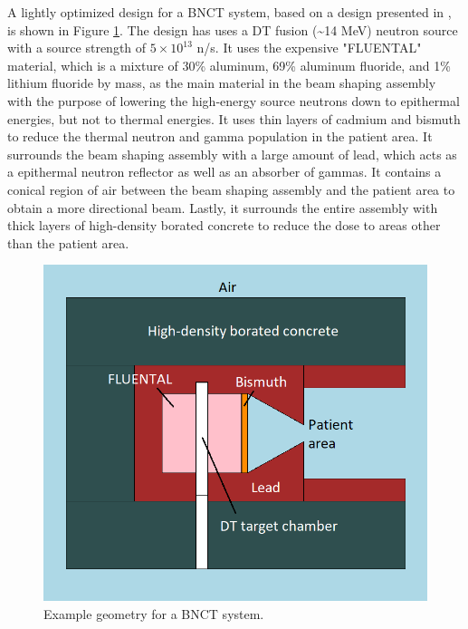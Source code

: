 A lightly optimized design for a BNCT system, based on a design presented in \cite{monshizadeh2015}, is shown in Figure \ref{fig:proposal:bnct_geom}.
The design has uses a DT fusion (\textasciitilde 14 MeV) neutron source with a source strength of $5\times 10^{13}$ n/s.
It uses the expensive "FLUENTAL" material, which is a mixture of 30\% aluminum, 69\% aluminum fluoride, and 1\% lithium fluoride by mass, as the main material in the beam shaping assembly with the purpose of lowering the high-energy source neutrons down to epithermal energies, but not to thermal energies.
It uses thin layers of cadmium and bismuth to reduce the thermal neutron and gamma population in the patient area.
It surrounds the beam shaping assembly with a large amount of lead, which acts as a epithermal neutron reflector as well as an absorber of gammas.
It contains a conical region of air between the beam shaping assembly and the patient area to obtain a more directional beam.
Lastly, it surrounds the entire assembly with thick layers of high-density borated concrete to reduce the dose to areas other than the patient area.
\begin{figure}[h!]
  \centering
  \includegraphics[width=0.75\linewidth]{content/proposal/BNCT_geom.png}
  \caption{Example geometry for a BNCT system.}
  \label{fig:proposal:bnct_geom}
\end{figure}

